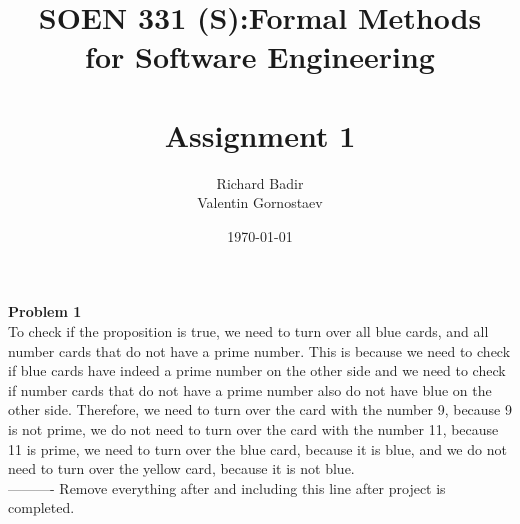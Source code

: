 \documentclass[12pt]{article}
\title{SOEN 331 (S):Formal Methods\\for Software Engineering\\
\ \\
Assignment 1}
\author{Richard Badir\\Valentin Gornostaev}
\date{\today}
\begin{document}
\maketitle



\newpage
\noindent \textbf{Problem 1}\\
\noindent To check if the proposition is true, we need to turn over all blue cards, and all number cards that do not have a prime number. This is because we need to check if blue cards have indeed a prime number on the other side and we need to check if number cards that do not have a prime number also do not have blue on the other side. Therefore, we need to turn over the card with the number 9, because 9 is not prime, we do not need to turn over the card with the number 11, because 11 is prime, we need to turn over the blue card, because it is blue, and we do not need to turn over the yellow card, because it is not blue.
\\
\noindent ---------- Remove everything after and including this line after project is completed.
\end{document}
